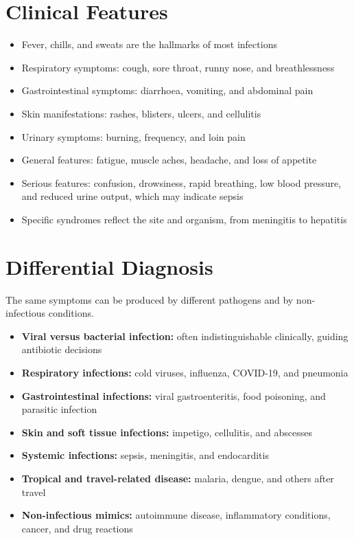 \section*{Clinical Features}
\begin{itemize}
    \item Fever, chills, and sweats are the hallmarks of most infections
    \item Respiratory symptoms: cough, sore throat, runny nose, and breathlessness
    \item Gastrointestinal symptoms: diarrhoea, vomiting, and abdominal pain
    \item Skin manifestations: rashes, blisters, ulcers, and cellulitis
    \item Urinary symptoms: burning, frequency, and loin pain
    \item General features: fatigue, muscle aches, headache, and loss of appetite
    \item Serious features: confusion, drowsiness, rapid breathing, low blood pressure, and reduced urine output, which may indicate sepsis
    \item Specific syndromes reflect the site and organism, from meningitis to hepatitis
\end{itemize}

\section*{Differential Diagnosis}
The same symptoms can be produced by different pathogens and by non-infectious conditions.
\begin{itemize}
    \item \textbf{Viral versus bacterial infection:} often indistinguishable clinically, guiding antibiotic decisions
    \item \textbf{Respiratory infections:} cold viruses, influenza, COVID-19, and pneumonia
    \item \textbf{Gastrointestinal infections:} viral gastroenteritis, food poisoning, and parasitic infection
    \item \textbf{Skin and soft tissue infections:} impetigo, cellulitis, and abscesses
    \item \textbf{Systemic infections:} sepsis, meningitis, and endocarditis
    \item \textbf{Tropical and travel-related disease:} malaria, dengue, and others after travel
    \item \textbf{Non-infectious mimics:} autoimmune disease, inflammatory conditions, cancer, and drug reactions
\end{itemize}

